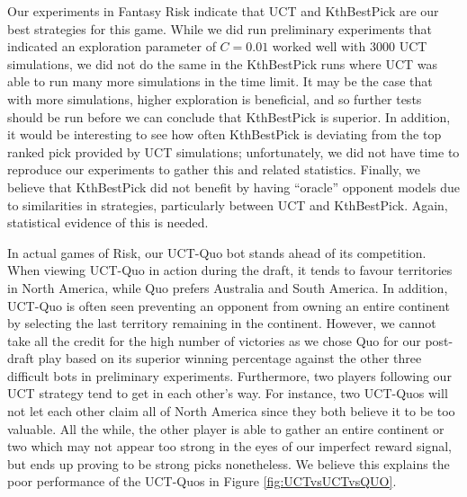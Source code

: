 \documentclass[letterpaper]{article}
\numberwithin{equation}{section}
\numberwithin{theorem}{section}
\numberwithin{lemma}{section}
\numberwithin{df}{section}
\begin{document}
Our experiments in Fantasy Risk indicate that UCT and KthBestPick are our best strategies for this game.  While we did run preliminary experiments that indicated an exploration parameter of $C = 0.01$ worked well with 3000 UCT simulations, we did not do the same in the KthBestPick runs where UCT was able to run many more simulations in the time limit.  It may be the case that with more simulations, higher exploration is beneficial, and so further tests should be run before we can conclude that KthBestPick is superior.  In addition, it would be interesting to see how often KthBestPick is deviating from the top ranked pick provided by UCT simulations; unfortunately, we did not have time to reproduce our experiments to gather this and related statistics.  Finally, we believe that KthBestPick did not benefit by having ``oracle'' opponent models due to similarities in strategies, particularly between UCT and KthBestPick.  Again, statistical evidence of this is needed.

In actual games of Risk, our UCT-Quo bot stands ahead of its competition.  When viewing UCT-Quo in action during the draft, it tends to favour territories in North America, while Quo prefers Australia and South America.  In addition, UCT-Quo is often seen preventing an opponent from owning an entire continent by selecting the last territory remaining in the continent.  However, we cannot take all the credit for the high number of victories as we chose Quo for our post-draft play based on its superior winning percentage against the other three difficult bots in preliminary experiments.  Furthermore, two players following our UCT strategy tend to get in each other's way.  For instance, two UCT-Quos will not let each other claim all of North America since they both believe it to be too valuable.  All the while, the other player is able to gather an entire continent or two which may not appear too strong in the eyes of our imperfect reward signal, but ends up proving to be strong picks nonetheless.  We believe this explains the poor performance of the UCT-Quos in Figure \ref{fig:UCTvsUCTvsQUO}.
\end{document}
